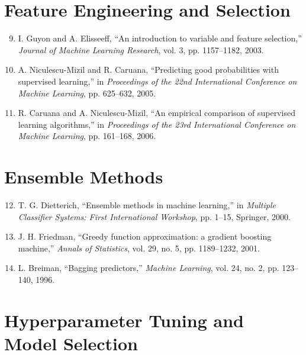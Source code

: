 \section*{Feature Engineering and Selection}

\begin{enumerate}
  \setcounter{enumi}{8}
  \item I. Guyon and A. Elisseeff, ``An introduction to variable and feature selection,'' \textit{Journal of Machine Learning Research}, vol. 3, pp. 1157--1182, 2003.
  
  \item A. Niculescu-Mizil and R. Caruana, ``Predicting good probabilities with supervised learning,'' in \textit{Proceedings of the 22nd International Conference on Machine Learning}, pp. 625--632, 2005.
  
  \item R. Caruana and A. Niculescu-Mizil, ``An empirical comparison of supervised learning algorithms,'' in \textit{Proceedings of the 23rd International Conference on Machine Learning}, pp. 161--168, 2006.
\end{enumerate}

\section*{Ensemble Methods}

\begin{enumerate}
  \setcounter{enumi}{11}
  \item T. G. Dietterich, ``Ensemble methods in machine learning,'' in \textit{Multiple Classifier Systems: First International Workshop}, pp. 1--15, Springer, 2000.
  
  \item J. H. Friedman, ``Greedy function approximation: a gradient boosting machine,'' \textit{Annals of Statistics}, vol. 29, no. 5, pp. 1189--1232, 2001.
  
  \item L. Breiman, ``Bagging predictors,'' \textit{Machine Learning}, vol. 24, no. 2, pp. 123--140, 1996.
\end{enumerate}

\section*{Hyperparameter Tuning and Model Selection}

